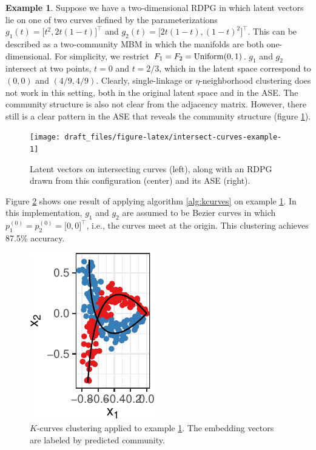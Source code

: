 \documentclass[
  12pt,
]{article}
\theoremstyle{definition}
\theoremstyle{definition}
\newtheorem{example}{Example}[section]
\theoremstyle{definition}
\theoremstyle{definition}
\theoremstyle{remark}
\begin{document}
\begin{example}
\label{ex:intersect-curves}
Suppose we have a two-dimensional RDPG in which latent vectors lie on one of two curves defined by the parameterizations $g_1(t) = \Big[ t^2, 2 t (1-t) \Big]^\top$ and $g_2(t) = \Big[ 2 t (1-t), (1-t)^2 \Big]^\top$. 
This can be described as a two-community MBM in which the manifolds are both one-dimensional. 
For simplicity, we restrict $F_1 = F_2 = \mathrm{Uniform}(0, 1)$. 
$g_1$ and $g_2$ intersect at two points, $t = 0$ and $t = 2/3$, which in the latent space correspond to $(0, 0)$ and $(4/9, 4/9)$. 
Clearly, single-linkage or $\eta$-neighborhood clustering does not work in this setting, both in the original latent space and in the ASE. 
The community structure is also not clear from the adjacency matrix. 
However, there still is a clear pattern in the ASE that reveals the community structure (figure \ref{fig:intersect-curves-example}). 

\begin{figure}[H]

{\centering \texttt{[image: draft\_files/figure-latex/intersect-curves-example-1]} 

}

\caption{Latent vectors on intersecting curves (left), along with an RDPG drawn from this configuration (center) and its ASE (right).}\label{fig:intersect-curves-example}
\end{figure}

Figure \ref{fig:intersect-curves-2} shows one result of applying algorithm \ref{alg:kcurves} on example \ref{ex:intersect-curves}. 
In this implementation, $g_1$ and $g_2$ are assumed to be Bezier curves in which $p_1^{(0)} = p_2^{(0)} = \Big[ 0, 0 \Big]^\top$, i.e., the curves meet at the origin. 
This clustering achieves 87.5\% accuracy. 

\begin{figure}[H]

{\centering \includegraphics{draft_files/figure-latex/intersect-curves-2-1} 

}

\caption{$K$-curves clustering applied to example \ref{ex:intersect-curves}. The embedding vectors are labeled by predicted community.}\label{fig:intersect-curves-2}
\end{figure}
\end{example}
\end{document}
